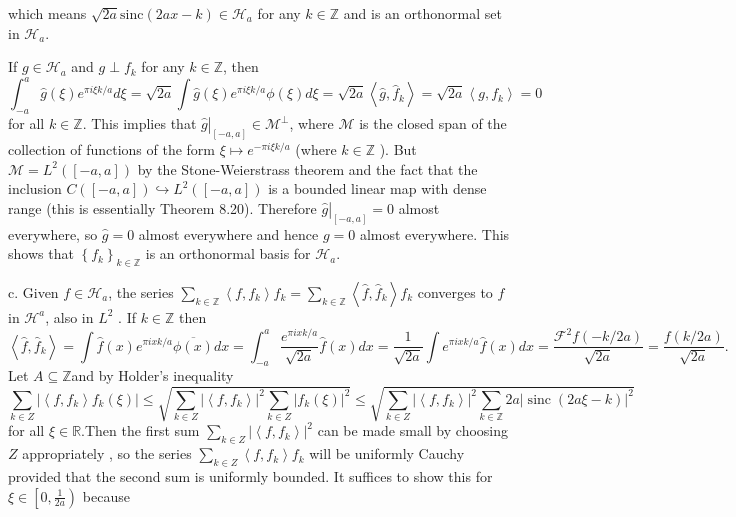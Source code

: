\documentclass[lang=en,11pt,a4paper,citestyle =authoryear]{elegantpaper}
\newcommand{\Z}{\mathbb{Z}}
\newcommand{\Hil}{\mathcal{H}}
\begin{document}
which means $\sqrt{2a}\text{sinc}(2ax-k)\in \Hil_a$ for any $k\in\Z$ and is an orthonormal set in $\Hil_a$.\par
If $g \in \mathcal{H}_{a}$ and $g \perp f_{k}$ for any $k\in\Z$, then
\[
\int_{-a}^{a} \widehat{g}(\xi) e^{\pi i \xi k / a} d \xi=\sqrt{2 a} \int \widehat{g}(\xi) e^{\pi i \xi k / a} \phi(\xi) d \xi=\sqrt{2 a}\left\langle\widehat{g}, \widehat{f}_{k}\right\rangle=\sqrt{2 a}\left\langle g, f_{k}\right\rangle=0
\]
for all $k \in \mathbb{Z}$. This implies that $\left.\widehat{g}\right|_{[-a, a]} \in \mathcal{M}^{\perp}$, where $\mathcal{M}$ is the closed span of the collection of functions of the form $\xi \mapsto e^{-\pi i \xi k / a}$ (where $k \in \mathbb{Z}$ ). But $\mathcal{M}=L^{2}([-a, a])$ by the Stone-Weierstrass theorem and the fact that the inclusion $C([-a, a]) \hookrightarrow L^{2}([-a, a])$ is a bounded linear map with dense range (this is essentially Theorem 8.20). Therefore $\left.\widehat{g}\right|_{[-a, a]}=0$ almost everywhere, so $\widehat{g}=0$ almost everywhere and hence $g=0$ almost everywhere. This shows that $\left\{f_{k}\right\}_{k \in \mathbb{Z}}$ is an orthonormal basis for $\mathcal{H}_{a}$.\par
c. Given $f \in \mathcal{H}_{a}$, the series $\sum_{k \in \mathbb{Z}}\left\langle f, f_{k}\right\rangle f_{k}=\sum_{k \in \mathbb{Z}}\left\langle\widehat{f}, \widehat{f}_{k}\right\rangle f_{k}$ converges to $f$ in $\mathcal{H}^{a}$, also in $L^{2}$ . If $k \in \mathbb{Z}$ then
\[
\left\langle\widehat{f}, \widehat{f}_{k}\right\rangle=\int \widehat{f}(x) e^{\pi i x k / a} \overline{\phi(x)} d x=\int_{-a}^{a} \frac{e^{\pi i x k / a}}{\sqrt{2 a}} \widehat{f}(x) d x=\frac{1}{\sqrt{2 a}} \int e^{\pi i x k / a} \widehat{f}(x) d x=\frac{\mathcal{F}^{2} f(-k / 2 a)}{\sqrt{2 a}}=\frac{f(k / 2 a)}{\sqrt{2 a}} .
\]
Let $A \subseteq \mathbb{Z}$and by Holder's inequality
\[
\sum_{k \in Z}\left|\left\langle f, f_{k}\right\rangle f_{k}(\xi)\right| \leq \sqrt{\sum_{k \in Z}\left|\left\langle f, f_{k}\right\rangle\right|^{2} \sum_{k \in Z}\left|f_{k}(\xi)\right|^{2}} \leq \sqrt{\sum_{k \in Z}\left|\left\langle f, f_{k}\right\rangle\right|^{2} \sum_{k \in \mathbb{Z}} 2 a|\operatorname{sinc}(2 a \xi-k)|^{2}}
\]
for all $\xi \in \mathbb{R}$.Then the first sum $\sum_{k \in Z}\left|\left\langle f, f_{k}\right\rangle\right|^{2}$ can be made small by choosing $Z$ appropriately , so the series $\sum_{k \in Z}\left\langle f, f_{k}\right\rangle f_{k}$ will be uniformly Cauchy provided that the second sum is uniformly bounded. It suffices to show this for $\xi \in\left[0, \frac{1}{2 a}\right)$ because
\end{document}
